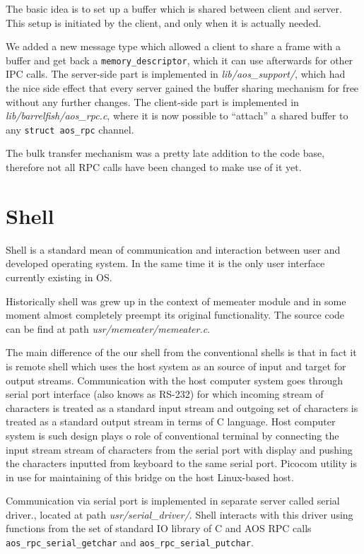 \documentclass[a4paper,10pt]{article}
\newcommand{\filepath}[1]{\emph{ #1}}
\begin{document}
The basic idea is to set up a buffer which is shared between client and server.
This setup is initiated by the client, and only when it is actually needed.

We added a new message type which allowed a client to share a frame with a buffer and get back a \lstinline!memory_descriptor!, which it can use afterwards for other IPC calls.
The server-side part is implemented in \filepath{lib/aos\_support/}, which had the nice side effect that every server gained the buffer sharing mechanism for free without any further changes.
The client-side part is implemented in \filepath{lib/barrelfish/aos\_rpc.c}, where it is now possible to ``attach'' a shared buffer to any \lstinline!struct aos_rpc! channel.

The bulk transfer mechanism was a pretty late addition to the code base, therefore not all RPC calls have been changed to make use of it yet.

\section{Shell}
	Shell is a standard mean of communication and interaction between user and developed operating system.
	In the same time it is the only user interface currently existing in OS.
	 
	Historically shell was grew up in the context of memeater module and in some moment almost completely preempt its original functionality. The source code can be find at path \filepath{usr/memeater/memeater.c}.
	
	The main difference of the our shell from the conventional shells is that in fact it is remote shell which uses the host system as an source of input and target for output streams. 
	Communication with the host computer system goes through serial port interface (also knows as RS-232) for which incoming stream of characters is treated as a standard input stream and outgoing set of characters is treated as a standard output stream in terms of C language. 
	Host computer system is such design plays o role of conventional terminal by connecting the input stream stream of characters from the serial port with display and pushing the characters inputted from keyboard to the same serial port.
	Picocom utility is in use for maintaining of this bridge on the host Linux-based host.
	
	Communication via serial port is implemented in separate server called serial driver., located at path \filepath{usr/serial\_driver/}.
	Shell interacts with this driver using functions from the set of standard IO library of C and AOS RPC calls \lstinline!aos_rpc_serial_getchar! and \lstinline!aos_rpc_serial_putchar!.
	
\end{document}
